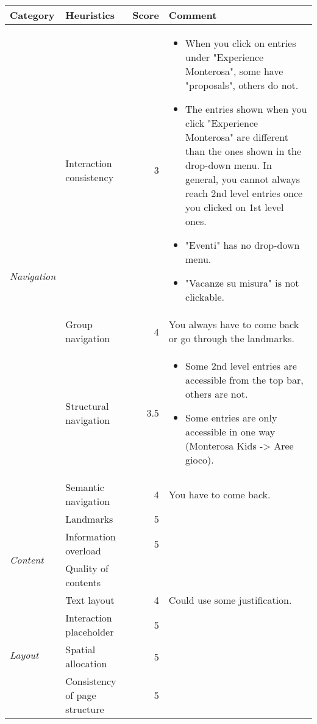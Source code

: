 \documentclass[a4paper, 11pt, parskip=half]{scrreprt}
\begin{document}
\begin{center}
    \def\arraystretch{1.3}
    \begin{tabular}{|l|l|r|m{7cm}|}
        \hline
        \textbf{Category} & \textbf{Heuristics} & \textbf{Score} & \textbf{Comment} \\ \hline
        \multirow{5}{*}{\textit{Navigation}} & Interaction consistency & 3 &
        \begin{itemize}
            \item When you click on entries under "Experience Monterosa", some have "proposals", others do not.
            \item The entries shown when you click "Experience Monterosa" are different than the ones shown in the drop-down menu. In general, you cannot always reach 2nd level entries once you clicked on 1st level ones.
            \item "Eventi" has no drop-down menu.
            \item "Vacanze su misura" is not clickable.
        \end{itemize} \\ \cline{2-4}
        & Group navigation & 4 & You always have to come back or go through the landmarks. \\ \cline{2-4}
        & Structural navigation & 3.5 & 
        \begin{itemize}
            \item Some 2nd level entries are accessible from the top bar, others are not.
            \item Some entries are only accessible in one way (Monterosa Kids -> Aree gioco).
        \end{itemize} \\ \cline{2-4}
        & Semantic navigation & 4 & You have to come back. \\ \cline{2-4}
        & Landmarks & 5 & \\ \hline
        \multirow{2}{*}{\textit{Content}} & Information overload & 5 & \\ \cline{2-4}
        & Quality of contents &  & 	\\ \hline
        \multirow{4}{*}{\textit{Layout}} & Text layout & 4 & Could use some justification. \\ \cline{2-4}
        & Interaction placeholder & 5 & \\ \cline{2-4}
        & Spatial allocation & 5 & \\ \cline{2-4}
        & Consistency of page structure & 5 & \\ \hline
    \end{tabular}
\end{center}
\end{document}
